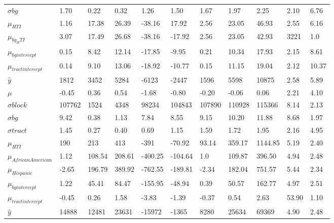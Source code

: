 \documentclass[a4paper,UKenglish]{lipics-v2018}
\begin{document}
\begin{table}
\begin{tabular}{p{2.4cm}p{1.5cm}p{1.5cm}p{1.5cm}p{1.5cm}p{1.5cm}p{1.5cm}p{1.5cm}p{1.5cm}p{1.5cm}p{1cm}}
    {$\sigma{bg}$} & 1.70  &  0.22 & 0.32  & 1.26 & 1.50  & 1.67  & 1.97 & 2.25 & 2.10 & 6.76  \\ 
    {$\mu_{HTI}$}  & 1.16  & 17.38 & 26.39  &-38.16 & 17.92 & 2.56  & 23.05 & 46.93 & 2.55 & 6.16 \\
    {$\mu_{bg_ HTI}$} & 3.07   & 17.49 & 26.68  & -38.16 & -17.92 & 2.56  & 23.05 & 42.93 & 3221 & 1.0  \\
    {$\mu_{bg intercept}$} & 0.15  & 8.42 & 12.14  & -17.85 & -9.95 &  0.21  & 10.34 & 17.93 & 2.15 & 8.61 \\ 
    {$\mu_{tract intercept}$} & 0.14 & 9.10 & 13.06  & -18.92 & -10.77 &  0.15  & 11.15 & 19.04 & 2.12 & 10.37 \\
    {$\hat{y}$}  &1812 & 3452 & 5284  & -6123 & -2447 &  1596  & 5598 & 10875 & 2.58  & 5.89 \\
    \midrule
    {$\mu$}  & -0.45  & 0.36 & 0.54 & -1.68  & -0.80 & -0.20 & -0.06  & 0.06 & 2.21 & 4.10 \\
    {$\sigma{block}$}  & 107762  & 1524 & 4348  & 98234 & 104843 & 107890  & 110928 & 115366  &8.14& 2.13 \\
    {$\sigma{bg}$} & 9.42  &  0.38 & 1.13  & 7.84 & 8.55  & 9.15  & 10.20 & 11.88 & 8.68 & 1.97  \\ 
    {$\sigma{tract}$} & 1.45  &  0.27 & 0.40  & 0.69 & 1.15  & 1.59  & 1.72 & 1.95 & 2.16 & 4.95  \\
    {$\mu_{HTI}$}  & 190  & 213 & 413  &-391 & -70.92 & 93.14  & 359.17 & 1144.85 & 5.19 & 2.40 \\
    {$\mu_{African American}$} & 1.12   & 108.54 & 208.61  &-400.25 & -104.64 &1.0  & 109.87 & 396.50 & 4.94 & 2.48  \\
    {$\mu_{Hispanic}$} & -2.65  & 196.79 & 389.92  & -762.55 & -189.81 &  -2.34  & 182.04 & 751.57 & 5.44 & 2.34 \\ 
    {$\mu_{bg intercept}$} & 1.22  & 45.41 & 84.47  & -155.95 & -48.94 &  0.39  & 50.57 & 162.77 & 4.97 & 2.51 \\ 
    {$\mu_{tract intercept}$} & -0.45 & 0.26 & 1.58  & -3.83 & -1.39 & -0.37  & 0.54 & 2.63 & 53.90 & 1.10 \\
    {$\hat{y}$}  &14888 & 12481 & 23631  & -15972 & -1365 &  8280  & 25634 & 69369 & 4.90  & 2.48 \\
    \bottomrule
\end{tabular}
\end{table}
\pagebreak

\begin{figure}[H]
\end{figure}
\pagebreak
\end{document}
